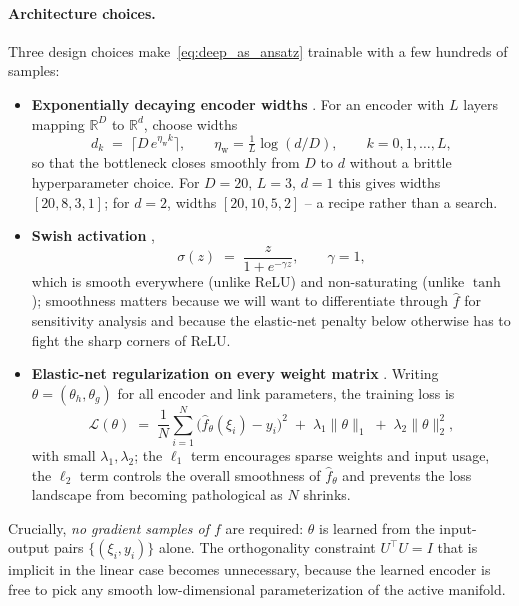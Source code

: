 \documentclass[11pt,a4paper]{report}
\newcommand{\R}{\mathbb{R}}
\begin{document}
\paragraph{Architecture choices.}
Three design choices make~\eqref{eq:deep_as_ansatz} trainable with a few hundreds of samples:
\begin{itemize}[itemsep=2pt]
\item \textbf{Exponentially decaying encoder widths} \citep[Eq.~20]{tripathy2018deep}.  For an encoder with $L$ layers mapping $\R^D$ to $\R^d$, choose widths
\begin{equation}
d_k \;=\; \bigl\lceil D \, e^{\eta_{\mathrm{w}} k} \bigr\rceil, \qquad \eta_{\mathrm{w}} = \tfrac{1}{L}\log(d/D), \qquad k = 0, 1, \ldots, L,
\label{eq:tb_widths}
\end{equation}
so that the bottleneck closes smoothly from $D$ to $d$ without a brittle hyperparameter choice.  For $D = 20,\, L = 3,\, d = 1$ this gives widths $[20, 8, 3, 1]$; for $d = 2$, widths $[20, 10, 5, 2]$ -- a recipe rather than a search.
\item \textbf{Swish activation} \citep[Eq.~10]{tripathy2018deep},
\begin{equation}
\sigma(z) \;=\; \frac{z}{1 + e^{-\gamma z}}, \qquad \gamma = 1,
\label{eq:swish}
\end{equation}
which is smooth everywhere (unlike ReLU) and non-saturating (unlike $\tanh$); smoothness matters because we will want to differentiate through $\hat f$ for sensitivity analysis and because the elastic-net penalty below otherwise has to fight the sharp corners of ReLU.
\item \textbf{Elastic-net regularization on every weight matrix} \citep[Eq.~12]{tripathy2018deep}.  Writing $\theta = (\theta_h, \theta_g)$ for all encoder and link parameters, the training loss is
\begin{equation}
\mathcal{L}(\theta) \;=\; \frac{1}{N}\sum_{i=1}^N \bigl(\hat f_\theta(\xi_i) - y_i\bigr)^2
\;+\; \lambda_1 \lVert \theta \rVert_1
\;+\; \lambda_2 \lVert \theta \rVert_2^2,
\label{eq:tb_loss}
\end{equation}
with small $\lambda_1, \lambda_2$; the $\ell_1$ term encourages sparse weights and input usage, the $\ell_2$ term controls the overall smoothness of $\hat f_\theta$ and prevents the loss landscape from becoming pathological as $N$ shrinks.
\end{itemize}
Crucially, \emph{no gradient samples of $f$} are required: $\theta$ is learned from the input-output pairs $\{(\xi_i, y_i)\}$ alone.  The orthogonality constraint $U^\top U = I$ that is implicit in the linear case becomes unnecessary, because the learned encoder is free to pick any smooth low-dimensional parameterization of the active manifold.
\end{document}
